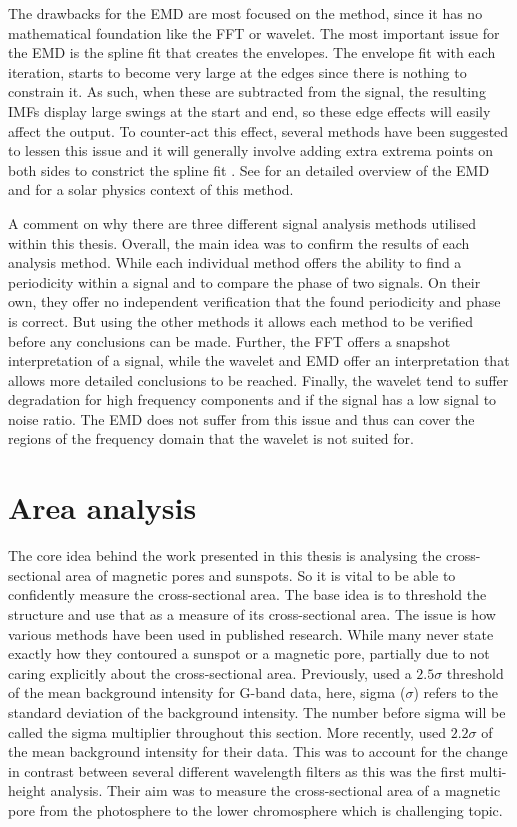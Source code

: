     The drawbacks for the EMD are most focused on the method, since it has no mathematical foundation like the FFT or wavelet.
    The most important issue for the EMD is the spline fit that creates the envelopes.
    The envelope fit with each iteration, starts to become very large at the edges since there is nothing to constrain it.
    As such, when these are subtracted from the signal, the resulting IMFs display large swings at the start and end, so these edge effects will easily affect the output.
    To counter-act this effect, several methods have been suggested to lessen this issue and it will generally involve adding extra extrema points on both sides to constrict the spline fit \citep{zeng2004simple}.
    See \cite{huang} for an detailed overview of the EMD and  \cite{terradas} for a solar physics context of this method.
    
    A comment on why there are three different signal analysis methods utilised within this thesis.
    Overall, the main idea was to confirm the results of each analysis method.
    While each individual method offers the ability to find a periodicity within a signal and to compare the phase of two signals. 
    On their own, they offer no independent verification that the found periodicity and phase is correct. 
    But using the other methods it allows each method to be verified before any conclusions can be made.
    Further, the FFT offers a snapshot interpretation of a signal, while the wavelet and EMD offer an interpretation that allows more detailed conclusions to be reached.
    Finally, the wavelet tend to suffer degradation for high frequency components and if the signal has a low signal to noise ratio.
    The EMD does not suffer from this issue and thus can cover the regions of the frequency domain that the wavelet is not suited for.
    
\section{Area analysis}

	The core idea behind the work presented in this thesis is analysing the cross-sectional area of magnetic pores and sunspots.
	So it is vital to be able to confidently measure the cross-sectional area.
    The base idea is to threshold the structure and use that as a measure of its cross-sectional area.
    The issue is how various methods have been used in published research.
    While many never state exactly how they contoured a sunspot or a magnetic pore, partially due to not caring explicitly about the cross-sectional area.
    Previously, \cite{morton2011} used a $2.5\sigma$ threshold of the mean background intensity for G-band data, here, sigma ($\sigma$) refers to the standard deviation of the background intensity.
    The number before sigma will be called the sigma multiplier throughout this section.
	More recently, \cite{0004-637X-806-1-132} used $2.2\sigma$ of the mean background intensity for their data.
    This was to account for the change in contrast between several different wavelength filters as this was the first multi-height analysis.
    Their aim was to measure the cross-sectional area of a magnetic pore from the photosphere to the lower chromosphere which is challenging topic.
	
